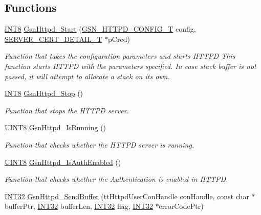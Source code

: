 \subsection*{Functions}
\begin{DoxyCompactItemize}
\item 
\hyperlink{a00660_ga307b8734c020247f6bac4fcde0dcfbb9}{INT8} \hyperlink{a00666_gae82a556385532a5c373c2c9700fa0959}{GsnHttpd\_\-Start} (\hyperlink{a00095}{GSN\_\-HTTPD\_\-CONFIG\_\-T} config, \hyperlink{a00459}{SERVER\_\-CERT\_\-DETAIL\_\-T} $\ast$pCred)
\begin{DoxyCompactList}\small\item\em Function that takes the configuration parameters and starts HTTPD This function starts HTTPD with the parameters specified. In case stack buffer is not passed, it will attempt to allocate a stack on its own. \end{DoxyCompactList}\item 
\hyperlink{a00660_ga307b8734c020247f6bac4fcde0dcfbb9}{INT8} \hyperlink{a00666_gadb4c2b217e18fcf95a912c9680fd29a2}{GsnHttpd\_\-Stop} ()
\begin{DoxyCompactList}\small\item\em Function that stops the HTTPD server. \end{DoxyCompactList}\item 
\hyperlink{a00660_gab27e9918b538ce9d8ca692479b375b6a}{UINT8} \hyperlink{a00666_gaa6cb01078a42676719b577ab37df15c4}{GsnHttpd\_\-IsRunning} ()
\begin{DoxyCompactList}\small\item\em Function that checks whether the HTTPD server is running. \end{DoxyCompactList}\item 
\hyperlink{a00660_gab27e9918b538ce9d8ca692479b375b6a}{UINT8} \hyperlink{a00666_ga4bf4a027427d6e572bfa6123b9ecb625}{GsnHttpd\_\-IsAuthEnabled} ()
\begin{DoxyCompactList}\small\item\em Function that checks whether the Authentication is enabled in HTTPD. \end{DoxyCompactList}\item 
\hyperlink{a00660_ga63021d67d54286c2163bcdb43a6f2569}{INT32} \hyperlink{a00666_ga95afa0c13f59a7b224e60c11a051a45a}{GsnHttpd\_\-SendBuffer} (ttHttpdUserConHandle conHandle, const char $\ast$bufferPtr, \hyperlink{a00660_ga63021d67d54286c2163bcdb43a6f2569}{INT32} bufferLen, \hyperlink{a00660_ga63021d67d54286c2163bcdb43a6f2569}{INT32} flag, \hyperlink{a00660_ga63021d67d54286c2163bcdb43a6f2569}{INT32} $\ast$errorCodePtr)

\end{DoxyCompactItemize}
